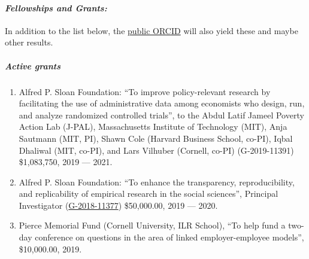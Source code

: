 \documentclass[10pt,letterpaper]{report}
\begin{document}
\paragraph{\it \bf Fellowships and Grants:}
In addition to the list below, the 
\href{http://orcid.org/0000-0001-5733-8932}{public ORCID} will also yield these and maybe other results.
\subparagraph{Active grants}
\begin{enumerate}
	\item Alfred P. Sloan Foundation: ``To improve policy-relevant research by facilitating the use of administrative data among economists who design, run, and analyze randomized controlled trials'', to the Abdul Latif Jameel Poverty Action	Lab (J-PAL), Massachusetts Institute	of Technology (MIT), Anja Sautmann (MIT, PI), Shawn Cole (Harvard Business School, co-PI), Iqbal Dhaliwal (MIT, co-PI), and Lars Vilhuber (Cornell, co-PI) (G‐2019-11391) \$1,083,750, 2019 --- 2021.
	\item Alfred P. Sloan Foundation: ``To enhance the transparency, reproducibility, and replicability of empirical research in the social sciences'', Principal Investigator  (\href{https://sloan.org/grant-detail/8801}{G-2018-11377})  \$50,000.00, 2019 --- 2020.
	\item Pierce Memorial Fund (Cornell University, ILR School), ``To help fund a two-day conference on questions in the area of linked employer-employee models'', \$10,000.00, 2019.
\end{enumerate}
\end{document}
